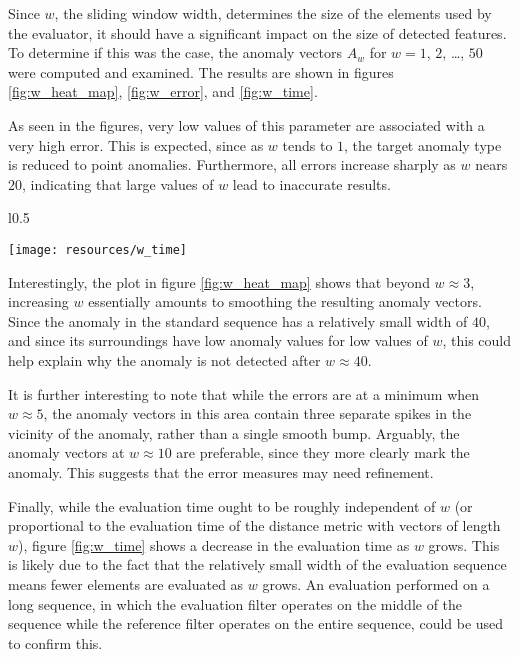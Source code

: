 Since $w$, the sliding window width, determines the size of the elements used by the evaluator, it should have a significant impact on the size of detected features. To determine if this was the case, the anomaly vectors $A_w$ for $w = 1$, $2$, \dots, $50$ were computed and examined. The results are shown in figures \ref{fig:w_heat_map}, \ref{fig:w_error}, and \ref{fig:w_time}.

As seen in the figures, very low values of this parameter are associated with a very high error. This is expected, since as $w$ tends to $1$, the target anomaly type is reduced to point anomalies. Furthermore, all errors increase sharply as $w$ nears $20$, indicating that large values of $w$ lead to inaccurate results.

\begin{wrapfigure}{l}{0.5\textwidth}
    \vspace{-25pt}
    \begin{center}
        \texttt{[image: resources/w\_time]}
    \end{center}
    \vspace{-20pt}
    \caption{\small{Evaluation times for the anomaly vectors $A_w$.}}
    \label{fig:w_time}
    \vspace{-20pt}
\end{wrapfigure}

Interestingly, the plot in figure \ref{fig:w_heat_map} shows that beyond $w \approx 3$, increasing $w$ essentially amounts to smoothing the resulting anomaly vectors. Since the anomaly in the standard sequence has a relatively small width of $40$, and since its surroundings have low anomaly values for low values of $w$, this could help explain why the anomaly is not detected after $w \approx 40$. 

It is further interesting to note that while the errors are at a minimum when $w \approx 5$, the anomaly vectors in this area contain three separate spikes in the vicinity of the anomaly, rather than a single smooth bump. Arguably, the anomaly vectors at $w \approx 10$ are preferable, since they more clearly mark the anomaly. This suggests that the error measures may need refinement.

Finally, while the evaluation time ought to be roughly independent of $w$ (or proportional to the evaluation time of the distance metric with vectors of length $w$), figure \ref{fig:w_time} shows a decrease in the evaluation time as $w$ grows. This is likely due to the fact that the relatively small width of the evaluation sequence means fewer elements are evaluated as $w$ grows. An evaluation performed on a long sequence, in which the evaluation filter operates on the middle of the sequence while the reference filter operates on the entire sequence, could be used to confirm this.

